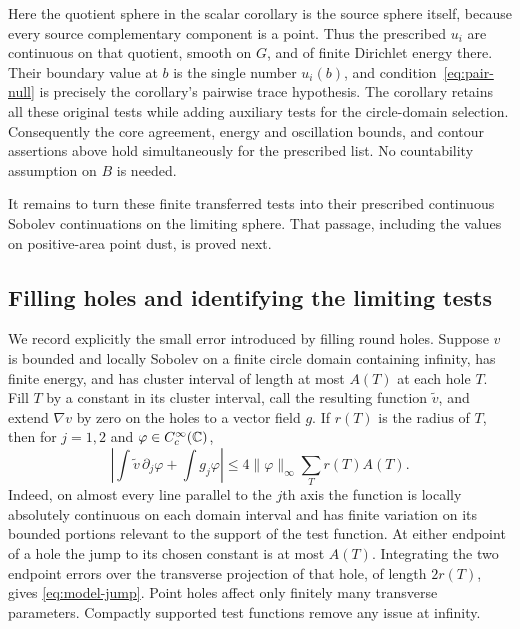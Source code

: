 Here the quotient sphere in the scalar corollary is the source sphere
itself, because every source complementary component is a point.
Thus the prescribed $u_i$ are continuous on that quotient, smooth on $G$,
and of finite Dirichlet energy there.  Their boundary value at $b$ is
the single number $u_i(b)$, and condition~\eqref{eq:pair-null} is
precisely the corollary's pairwise trace hypothesis.  The corollary
retains all these original tests while adding auxiliary tests for the
circle-domain selection.  Consequently the core agreement, energy and
oscillation bounds, and contour assertions above hold simultaneously
for the prescribed list.  No countability assumption on $B$ is needed.

It remains to turn these finite transferred tests into their prescribed
continuous Sobolev continuations on the limiting sphere.  That passage,
including the values on positive-area point dust, is proved next.

\subsection{Filling holes and identifying the limiting tests}

We record explicitly the small error introduced by filling round
holes.  Suppose $v$ is bounded and locally Sobolev on a finite circle
domain containing infinity, has finite energy, and has cluster
interval of length at most $A(T)$ at each hole $T$.  Fill $T$ by a
constant in its cluster interval, call the resulting function
$\widetilde v$, and extend $\nabla v$ by zero on the holes to a vector
field $g$.  If $r(T)$ is the radius of $T$, then for
$j=1,2$ and $\varphi\in C_c^\infty(\mathbb C)$,
\begin{equation}\label{eq:model-jump}
 \left|\int\widetilde v\,\partial_j\varphi
             +\int g_j\varphi\right|
 \le4\|\varphi\|_\infty\sum_T r(T)A(T).
\end{equation}
Indeed, on almost every line parallel to the $j$th axis the function
is locally absolutely continuous on each domain interval and has finite
variation on its bounded portions relevant to the support of the test
function.  At either endpoint of a hole the jump to its
chosen constant is at most $A(T)$.  Integrating the two endpoint
errors over the transverse projection of that hole, of length
$2r(T)$, gives \eqref{eq:model-jump}.  Point holes affect only finitely
many transverse parameters.  Compactly supported test functions
remove any issue at infinity.


